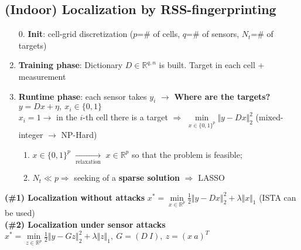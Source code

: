 \documentclass[a4paper, 12pt]{article}
\begin{document}
{\color{red}\subsection*{(Indoor) Localization by RSS-fingerprinting \quad{}}}
\begin{enumerate}
    \itemsep0em
    \item[0.] \textbf{Init}: cell-grid discretization ($p$=\# of cells, $q$=\# of sensors, $N_t$=\# of targets)
    \item \textbf{Training phase}: Dictionary $D\in\mathbb{R}^{q,n}$ is built. Target in each cell + measurement
    \item \textbf{Runtime phase}: each sensor takes $y_i$ $\longrightarrow$ \textbf{Where are the targets?} $y=Dx+\eta, \ x_i\in\{0,1\}$\\
    $x_i=1 \rightarrow $ in the $i$-th cell there is a target $\Longrightarrow$ $\underset{x\in\{0,1\}^p}{\min} \Vert y-Dx \Vert_2^2$ (mixed-integer $\rightarrow$ NP-Hard)
    \vspace{-0.3cm}
    \begin{enumerate}
        \itemsep0em
        \item $x\in\{0,1\}^p$ $\underset{\text{relaxation}}{\longrightarrow}$ $x\in\mathbb{R}^p$ so that the problem is feasible; 
        \item $N_t \ll p \Rightarrow$ seeking of a \textbf{sparse solution} $\Longrightarrow$ LASSO  
    \end{enumerate} 
\end{enumerate}

\noindent
\textbf{(\#1) Localization without attacks} 
$x^*=\underset{x\in\mathbb{R}^p}{\min} \frac{1}{2} \Vert y-Dx \Vert_2^2 + \lambda \Vert x \Vert_1$ (ISTA can be used)\\
\noindent
\textbf{(\#2) Localization under sensor attacks}
$x^*=\underset{z\in\mathbb{R}^p}{\min} \frac{1}{2} \Vert y-Gz \Vert_2^2 + \lambda \Vert z \Vert_1, \ G=(D \ I), \ z=(x \ a)^T$\\
\end{document}
